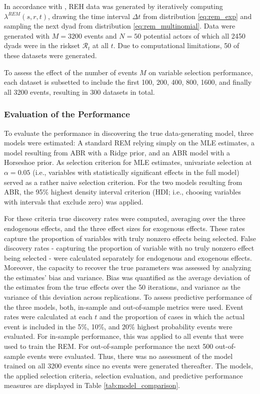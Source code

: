 \documentclass{article}
\begin{document}
\begin{spacing}{2}
\begin{justify}
In accordance with \citet{Lakdawala2024}, REH data was generated by iteratively computing $\lambda^{REM}(s,r,t)$, drawing the time interval $\Delta t$ from distribution \eqref{eq:rem_exp} and sampling the next dyad from distribution \eqref{eq:rem_multinomial}. Data were generated with $M = 3200$ events and $N=50$ potential actors of which all 2450 dyads were in the riskset $\mathcal{R}_t$ at all $t$. Due to computational limitations, 50 of these datasets were generated.

To assess the effect of the number of events $M$ on variable selection performance, each dataset is subsetted to include the first 100, 200, 400, 800, 1600, and finally all 3200 events, resulting in 300 datasets in total.

\subsubsection{Evaluation of the Performance}

To evaluate the performance in discovering the true data-generating model, three models were estimated: A standard REM relying simply on the MLE estimates, a model resulting from ABR with a Ridge prior, and an ABR model with a Horseshoe prior. As selection criterion for MLE estimates, univariate selection at $\alpha = 0.05$ (i.e., variables with statistically significant effects in the full model) served as a rather naive selection criterion. For the two models resulting from ABR, the 95\% highest density interval criterion (HDI; i.e., choosing variables with intervals that exclude zero) was applied.

For these criteria true discovery rates were computed, averaging over the three endogenous effects, and the three effect sizes for exogenous effects. These rates capture the proportion of variables with truly nonzero effects being selected. False discovery rates - capturing the proportion of variable with no truly nonzero effect being selected - were calculated separately for endogenous and exogenous effects. Moreover, the capacity to recover the true parameters was assessed by analyzing the estimates' bias and variance. Bias was quantified as the average deviation of the estimates from the true effects over the 50 iterations, and variance as the variance of this deviation across replications. To assess predictive performance of the three models, both, in-sample and out-of-sample metrics were used. Event rates were calculated at each $t$ and the proportion of cases in which the actual event is included in the 5\%, 10\%, and 20\% highest probability events were evaluated. For in-sample performance, this was applied to all events that were used to train the REM. For out-of-sample performance the next 500 out-of-sample events were evaluated. Thus, there was no assessment of the model trained on all 3200 events since no events were generated thereafter. The models, the applied selection criteria, selection evaluation, and predictive performance measures are displayed in Table \ref{tab:model_comparison}.



\end{justify}
\end{spacing}
\end{document}
